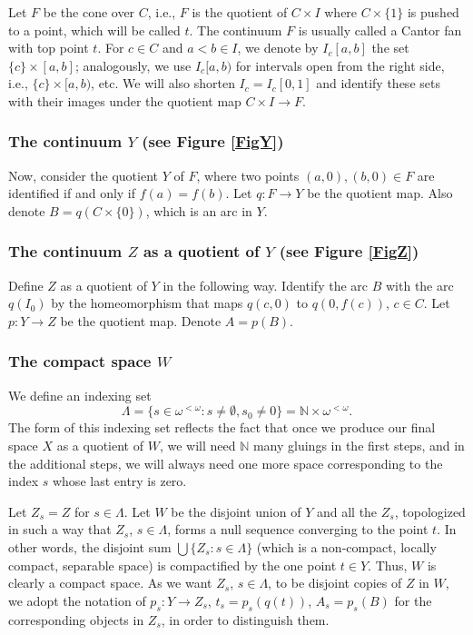 \documentclass[12pt]{article}
\theoremstyle{definition}
\theoremstyle{remark}
\begin{document}
Let $F$ be the cone over $C$, i.e., $F$ is the quotient of $C\times I$ where $C\times \{1\}$ is pushed to a point, which will be called $t$. The continuum $F$ is usually called a Cantor fan with top point $t$. 
For $c\in C$ and $a<b\in I$, we denote by $I_c[a,b]$ the set $\{c\}\times [a,b]$; analogously, we use $I_c[a,b)$ for intervals open from the right side, i.e., $\{c\}\times [a,b)$, etc.
We will also shorten $I_c=I_c[0,1]$ and identify these sets with their images under the quotient map $C\times I \to F$.


\subsubsection*{The continuum $Y$ (see Figure \ref{FigY})}

Now, consider the quotient $Y$ of $F$, where two points $(a,0), (b,0)\in F$ are identified if and only if $f(a)=f(b)$. Let $q: F\to Y$ be the quotient map. 
Also denote $B=q(C\times \{0\})$, which is an arc in $Y$. 





\subsubsection*{The continuum $Z$ as a quotient of $Y$ (see Figure \ref{FigZ})}

Define $Z$ as a quotient of $Y$ in the following way.
Identify the arc $B$ with the arc $q(I_0)$ by the homeomorphism that maps $q(c,0)$ to $q(0,f(c))$, $c\in C$. Let $p: Y\to Z$ be the quotient map. Denote $A=p(B)$.





\subsubsection*{The compact space $W$}

We define an indexing set 
\[\Lambda=\{s\in\omega^{<\omega}: s\neq\emptyset, s_0\neq 0\}=\mathbb N\times \omega^{<\omega}.\]
The form of this indexing set reflects the fact 
that once we produce our final space $X$ as a quotient of $W$, we will need $\mathbb N$ many gluings in the first steps, and in the additional steps, we will always need one more space corresponding to the index $s$ whose last entry is zero.

Let $Z_s=Z$ for $s\in \Lambda$.
Let $W$ be the disjoint union of $Y$ and all the $Z_s$, topologized in such a way that $Z_s$, $s\in \Lambda$, forms a null sequence converging to the point $t$.
In other words, the disjoint sum $\bigcup \{Z_s: s\in \Lambda\}$ (which is a non-compact, locally compact, separable space) is compactified by the one point $t\in Y$. 
Thus, $W$ is clearly a compact space.
As we want $Z_s$, $s\in\Lambda$, to be disjoint copies of $Z$ in $W$, we adopt the notation of $p_s: Y\to Z_s$, $t_s=p_s(q(t))$, $A_s=p_s(B)$ for the corresponding objects in $Z_s$, in order to distinguish them.
\end{document}
